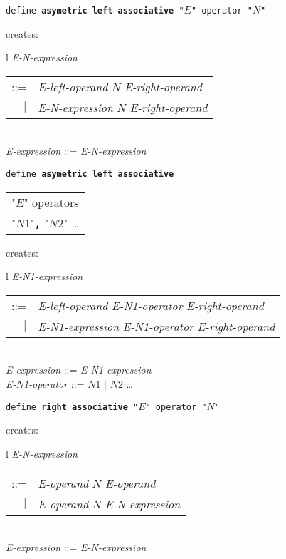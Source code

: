 \documentclass[12pt]{article}
\newcommand{\TT}[1]{{\tt \bfseries #1}}
\newenvironment{indpar}[1][0.3in]%
	{\begin{list}{}%
		     {\setlength{\itemsep}{0in}%
		      \setlength{\topsep}{0in}%
		      \setlength{\parsep}{1ex}%
		      \setlength{\labelwidth}{#1}%
		      \setlength{\leftmargin}{#1}%
		      \addtolength{\leftmargin}{\labelsep}}%
	 \item}%
	{\end{list}}
\begin{document}
\begin{indpar}
{\tt define \TT{asymetric left associative} "$E$" operator "$N$"}
\begin{indpar}
creates: \begin{tabular}[t]{l}
         {\em E-N-expression} \begin{tabular}[t]{rl}
                            ::= & {\em E-left-operand} $N$
			          {\em E-right-operand} \\
                            $|$ & {\em E-N-expression} $N$
			          {\em E-right-operand} \\
                            \end{tabular} \\
         {\em E-expression} ::= {\em E-N-expression} \\
	 \end{tabular}
\end{indpar}

{\tt define \TT{asymetric left associative} \begin{tabular}[t]{l}
                                             "$E$" operators \\
					     "$N1$"\TT{,} "$N2$" \ldots \\
					     \end{tabular}}
\begin{indpar}
creates: \begin{tabular}[t]{l}
         {\em E-N1-expression} \begin{tabular}[t]{rl}
                            ::= & {\em E-left-operand} {\em E-N1-operator}
			          {\em E-right-operand} \\
                            $|$ & {\em E-N1-expression} {\em E-N1-operator}
			          {\em E-right-operand} \\
                            \end{tabular} \\
         {\em E-expression} ::= {\em E-N1-expression} \\
         {\em E-N1-operator} ::= $N1$ $|$ $N2$ \ldots \\
	 \end{tabular}
\end{indpar}

{\tt define \TT{right associative} "$E$" operator "$N$"}
\begin{indpar}
creates: \begin{tabular}[t]{l}
         {\em E-N-expression} \begin{tabular}[t]{rl}
                            ::= & {\em E-operand} $N$ {\em E-operand} \\
                            $|$ & {\em E-operand} $N$ {\em E-N-expression} \\
                            \end{tabular} \\
         {\em E-expression} ::= {\em E-N-expression} \\
	 \end{tabular}
\end{indpar}


\end{indpar}
\end{document}
